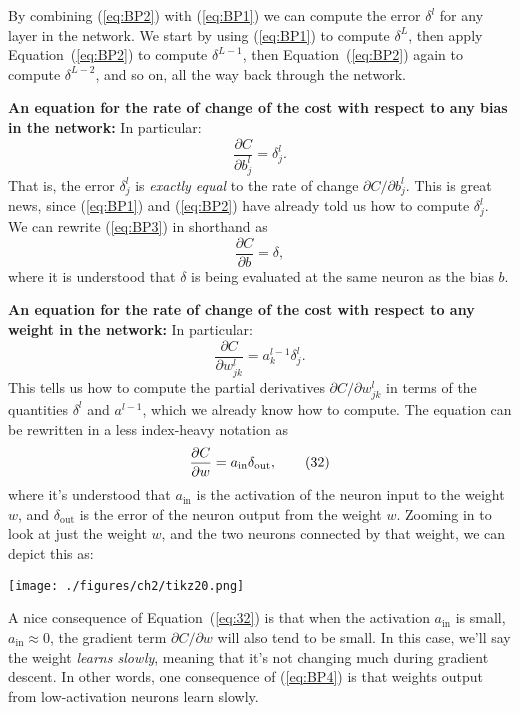 \documentclass[a4paper,twoside,10pt]{book}
\begin{document}
By combining (\ref{eq:BP2}) with (\ref{eq:BP1}) we can compute the error $\delta^l$ for any layer in the network. We start by using (\ref{eq:BP1}) to compute $\delta^L$, then apply Equation~(\ref{eq:BP2}) to compute $\delta^{L-1}$, then Equation~(\ref{eq:BP2}) again to compute $\delta^{L-2}$, and so on, all the way back through the network.

\textbf{An equation for the rate of change of the cost with respect to any bias in the network:} In particular:
\begin{equation}
\frac{\partial C}{\partial b^l_j} = \delta^l_j.
\tag{BP3}\label{eq:BP3}
\end{equation}
That is, the error $\delta^l_j$ is \textit{exactly equal} to the rate of change $\partial{}C/\partial{}b^l_j$. This is great news, since (\ref{eq:BP1}) and (\ref{eq:BP2}) have already told us how to compute $\delta^l_j$. We can rewrite (\ref{eq:BP3}) in shorthand as
\begin{equation}
\frac{\partial C}{\partial b} = \delta,\tag{31}\label{eq:31}
\end{equation}
where it is understood that $\delta$ is being evaluated at the same neuron as the bias $b$.

\textbf{An equation for the rate of change of the cost with respect to any weight in the network:} In particular:
\begin{equation}
\frac{\partial C}{\partial w^l_{jk}} = a^{l-1}_k \delta^l_j.
\tag{BP4}\label{eq:BP4}
\end{equation}
This tells us how to compute the partial derivatives $\partial{}C/\partial{}w^l_{jk}$ in terms of the quantities $\delta^l$ and $a^{l-1}$, which we already know how to compute. The equation can be rewritten in a less index-heavy notation as
\begin{equation}
\frac{\partial C}{\partial w} = a_{\rm in} \delta_{\rm out},
\tag{32}\label{eq:32}
\end{equation}
where it's understood that $a_\mathrm{in}$ is the activation of the neuron input to the weight $w$, and $\delta_\mathrm{out}$ is the error of the neuron output from the weight $w$. Zooming in to look at just the weight $w$, and the two neurons connected by that weight, we can depict this as:

\begin{center}
	\texttt{[image: ./figures/ch2/tikz20.png]}
\end{center}
A nice consequence of Equation~(\ref{eq:32}) is that when the activation $a_\mathrm{in}$ is small, $a_\mathrm{in}\approx0$, the gradient term $\partial{}C/\partial{}w$ will also tend to be small. In this case, we'll say the weight \textit{learns slowly}, meaning that it's not changing much during gradient descent. In other words, one consequence of (\ref{eq:BP4}) is that weights output from low-activation neurons learn slowly.
\end{document}
